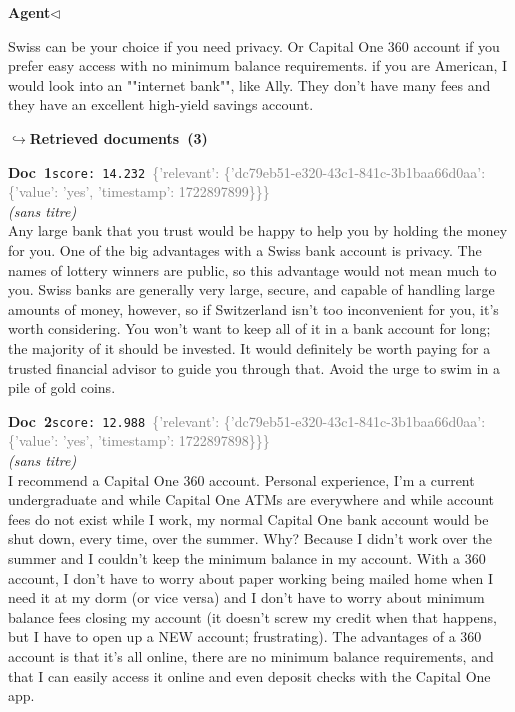 \documentclass[a4paper,11pt]{article}
\begin{document}
\noindent\hfill{\small\textcolor{agentcolor}{\textbf{Agent\enspace$\triangleleft$}}}
\begin{agentbubble}
Swiss can be your choice if you need privacy. Or Capital One 360 account if you prefer easy access with no minimum balance requirements. if you are American, I would look into an ""internet bank"", like Ally. They don't have many fees and they have an excellent high-yield savings account.
\end{agentbubble}
\noindent\hfill{\footnotesize\textcolor{doccolor}{\textbf{$\hookrightarrow$\enspace Retrieved documents~(3)}}}
\begin{docenv}
{\footnotesize\textcolor{doccolor}{\textbf{Doc~1}}}\hfill{\tiny\texttt{score:~14.232}}\ {\tiny\textcolor{gray}{\{'relevant': \{'dc79eb51-e320-43c1-841c-3b1baa66d0aa': \{'value': 'yes', 'timestamp': 1722897899\}\}\}}}\\[3pt]
{\small\textit{(sans titre)}}\\[2pt]
\vspace{2pt}
{\footnotesize 
Any large bank that you trust would be happy to help you by holding the money for you.  One of the big advantages with a Swiss bank account is privacy. The names of lottery winners are public, so this advantage would not mean much to you. Swiss banks are generally very large, secure, and capable of handling large amounts of money, however, so if Switzerland isn't too inconvenient for you, it's worth considering.  You won't want to keep all of it in a bank account for long; the majority of it should be invested. It would definitely be worth paying for a trusted financial advisor to guide you through that.  Avoid the urge to swim in a pile of gold coins.}
\end{docenv}
\begin{docenv}
{\footnotesize\textcolor{doccolor}{\textbf{Doc~2}}}\hfill{\tiny\texttt{score:~12.988}}\ {\tiny\textcolor{gray}{\{'relevant': \{'dc79eb51-e320-43c1-841c-3b1baa66d0aa': \{'value': 'yes', 'timestamp': 1722897898\}\}\}}}\\[3pt]
{\small\textit{(sans titre)}}\\[2pt]
\vspace{2pt}
{\footnotesize 
I recommend a Capital One 360 account. Personal experience, I'm a current undergraduate and while Capital One ATMs are everywhere and while account fees do not exist while I work, my normal Capital One bank account would be shut down, every time, over the summer. Why? Because I didn't work over the summer and I couldn't keep the minimum balance in my account. With a 360 account, I don't have to worry about paper working being mailed home when I need it at my dorm (or vice versa) and I don't have to worry about minimum balance fees closing my account (it doesn't screw my credit when that happens, but I have to open up a NEW account; frustrating). The advantages of a 360 account is that it's all online, there are no minimum balance requirements, and that I can easily access it online and even deposit checks with the Capital One app.}
\end{docenv}
\end{document}
